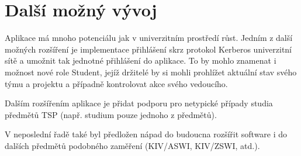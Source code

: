 \documentclass[czech,BP]{thesiskiv}
\begin{document}
	\section{Další možný vývoj}
	\par Aplikace má mnoho potenciálu jak v univerzitním prostředí růst. Jedním z další možných rozšíření je implementace přihlášení skrz protokol Kerberos univerzitní sítě a umožnit tak jednotné přihlášení do aplikace. To by mohlo znamenat i možnost nové role Student, jejíž držitelé by si mohli prohlížet aktuální stav svého týmu a projektu a případně kontrolovat akce svého vedoucího.
	\par Dalším rozšířením aplikace je přidat podporu pro netypické případy studia předmětů TSP (např. studium pouze jednoho z předmětů).
	\par V neposlední řadě také byl předložen nápad do budoucna rozšířit software i do dalších předmětů podobného zaměření (KIV/ASWI, KIV/ZSWI, atd.).
\listoffigures
%
%
\lstlistoflistings
% 
\end{document}
